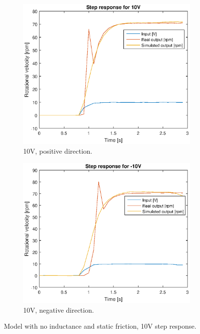 \begin{figure}[H]
    \centering
    \begin{subfigure}[H]{0.48\textwidth}
    \includegraphics[width=\textwidth]{./img/testrig_10Vstep_no_i_no_fric.eps}
    \caption{10V, positive direction.}
    \label{fig:step10}
    \end{subfigure}
    \begin{subfigure}[H]{0.48\textwidth}
    \includegraphics[width=\textwidth]{./img/testrig_m10Vstep_no_i_no_fric.eps}
    \caption{10V, negative direction.}
    \label{fig:stepm10}
    \end{subfigure}
    \caption{Model with no inductance and static friction, 10V step response.}
\end{figure}
